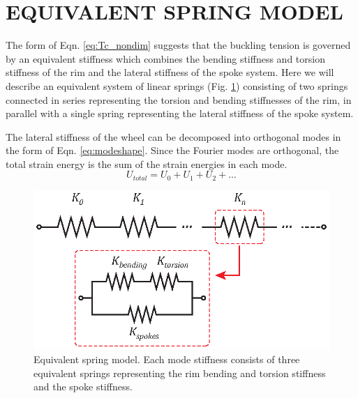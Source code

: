 \documentclass{bmd2016p}
\begin{document}
\section{EQUIVALENT SPRING MODEL}
The form of Eqn. \ref{eq:Tc_nondim} suggests that the buckling tension is governed by an equivalent stiffness which combines the bending stiffness and torsion stiffness of the rim and the lateral stiffness of the spoke system. Here we will describe an equivalent system of linear springs (Fig. \ref{fig:Kn}) consisting of two springs connected in series representing the torsion and bending stiffnesses of the rim, in parallel with a single spring representing the lateral stiffness of the spoke system.

The lateral stiffness of the wheel can be decomposed into orthogonal modes in the form of Eqn. \ref{eq:modeshape}. Since the Fourier modes are orthogonal, the total strain energy is the sum of the strain energies in each mode.
	\begin{equation}\label{eq:Umode}
	U_{total} = U_0 + U_1 + U_2 + ...
	\end{equation}

\begin{figure}[!ht]
\centering
\includegraphics[scale=1.0]{figures/bmd_figures-03.eps}
\caption{Equivalent spring model. Each mode stiffness consists of three equivalent springs representing the rim bending and torsion stiffness and the spoke stiffness.}
\label{fig:Kn}
\end{figure}
\end{document}
